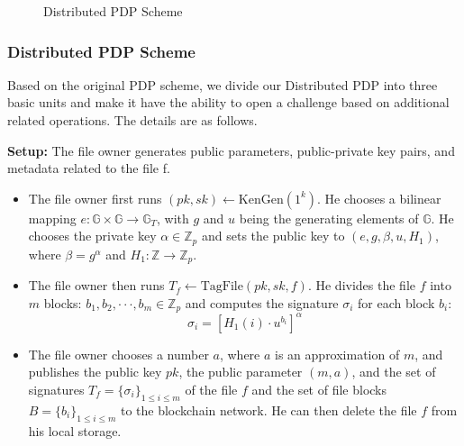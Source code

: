 \documentclass[journal]{IEEEtran}
\begin{document}
\begin{figure}[htbp]
    \centering
    \caption{Distributed PDP Scheme}
    \label{fig:PDP} 
\end{figure}


\subsubsection{Distributed PDP Scheme}
Based on the original PDP\cite{2007pdp} scheme, we divide our Distributed PDP into three basic units and make it have the ability to open a challenge based on additional related operations. The details are as follows.


\textbf{Setup:} 
The file owner generates public parameters, public-private key pairs, and metadata related to the file f.
\begin{itemize}
    \item 
    The file owner first runs $(pk,sk)\leftarrow \text{KenGen}(1^{k})$. He chooses a bilinear mapping $e:\mathbb{G}\times\mathbb{G}\rightarrow\mathbb{G}_{T}$, with $g$ and $u$ being the generating elements of $\mathbb{G}$. He chooses the private key $\alpha\in\mathbb{Z}_{p}$ and sets the public key to $(e,g,\beta,u,H_{1})$, where $\beta=g^{\alpha}$ and $H_{1}:\mathbb{Z}\rightarrow\mathbb{Z}_{p}$.
    \item 
    The file owner then runs $T_{f}\leftarrow \text{TagFile}(pk,sk,f)$. He divides the file $f$ into $m$ blocks: $b_{1},b_{2},\cdot\cdot\cdot,b_{m}\in\mathbb{Z}_{p}$ and computes the signature $\sigma_{i}$ for each block $b_i$:
    \begin{equation}
    \sigma_{i}=[H_{1}(i)\cdot u^{b_{i}}]^{\alpha}
    \end{equation}
    \item 
    The file owner chooses a number $a$, where $a$ is an approximation of $m$, and publishes the public key $pk$, the public parameter $(m, a)$, and the set of signatures $T_{f}=\{\sigma_{i}\}_{1\le i\le m}$ of the file $f$ and the set of file blocks $B=\{b_{i}\}_{1\le i\le m}$ to the blockchain network. He can then delete the file $f$ from his local storage.
\end{itemize}
\end{document}
